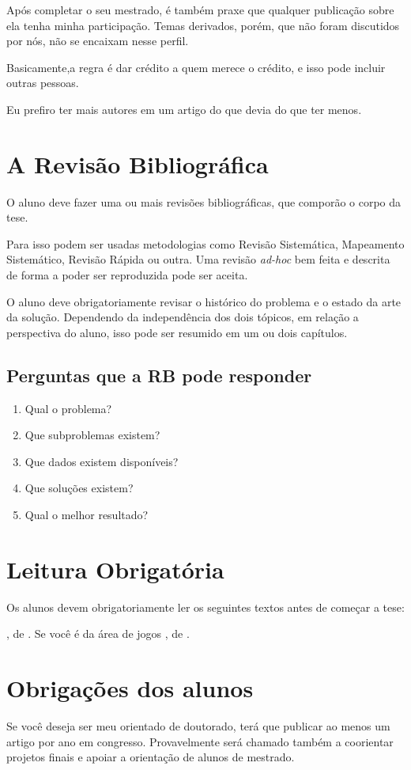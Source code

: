 \documentclass{a4paper,12pt}{report}
\newcommand{\listalivro}[1]{\citetitle{#1}, de \citet{#1}.}
\begin{document}
Após completar o seu mestrado, é também praxe que qualquer publicação sobre ela tenha minha participação.
Temas derivados, porém, que não foram discutidos por nós, não se encaixam nesse perfil.

Basicamente,a regra é dar crédito a quem merece o crédito, e isso pode incluir outras pessoas.

Eu prefiro ter mais autores em um artigo do que devia do que ter menos.

\chapter{A Revisão Bibliográfica}

O aluno deve fazer uma ou mais revisões bibliográficas, que comporão o corpo da tese.

Para isso podem ser usadas metodologias como Revisão Sistemática, Mapeamento Sistemático, Revisão Rápida ou outra. Uma revisão \textit{ad-hoc} bem feita e descrita de forma a poder ser reproduzida pode ser aceita.

O aluno deve obrigatoriamente revisar o histórico do problema e o estado da arte da solução. Dependendo da independência dos dois tópicos, em relação a perspectiva do aluno, isso pode ser resumido em um ou dois capítulos.

\section{Perguntas que a RB pode responder}
\begin{enumerate}
    \item Qual o problema?
    \item Que subproblemas existem?
    \item Que dados existem disponíveis?
    \item Que soluções existem?
    \item Qual o melhor resultado?
\end{enumerate}

\chapter{Leitura Obrigatória}

Os alunos devem obrigatoriamente ler os seguintes textos antes de começar a tese:
\begin{outline}
\1 \listalivro{Dresch:2015}
\1 Se você é da área de jogos
\2 \listalivro{Xexeo:2017}
\end{outline}

\chapter{Obrigações dos alunos}

Se você deseja ser meu orientado de doutorado, terá que publicar ao menos um artigo por ano em congresso. Provavelmente será chamado também a coorientar projetos finais e apoiar a orientação de alunos de mestrado.



\backmatter
\printbibliography
\end{document}
